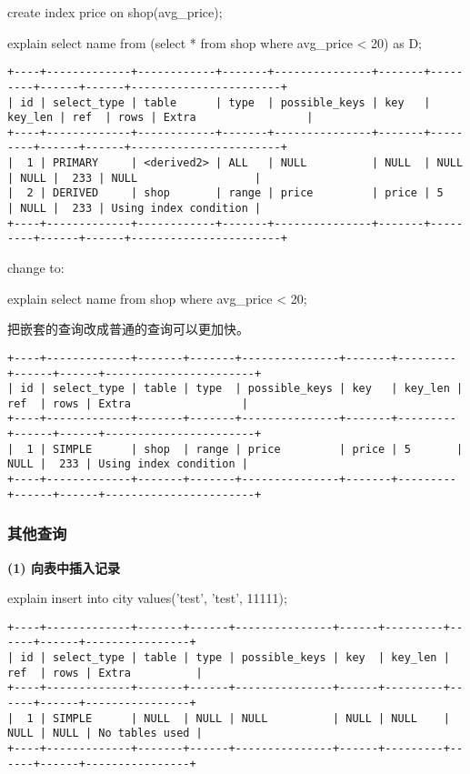 \documentclass[a4paper, 11pt, nofonts, nocap, fancyhdr]{ctexart}
\begin{document}
create index price on shop(avg\_price);

explain select name from (select * from shop where avg\_price < 20) as D;

\begin{verbatim}
+----+-------------+------------+-------+---------------+-------+---------+------+------+-----------------------+
| id | select_type | table      | type  | possible_keys | key   | key_len | ref  | rows | Extra                 |
+----+-------------+------------+-------+---------------+-------+---------+------+------+-----------------------+
|  1 | PRIMARY     | <derived2> | ALL   | NULL          | NULL  | NULL    | NULL |  233 | NULL                  |
|  2 | DERIVED     | shop       | range | price         | price | 5       | NULL |  233 | Using index condition |
+----+-------------+------------+-------+---------------+-------+---------+------+------+-----------------------+
\end{verbatim}

change to:

explain select name from shop where avg\_price < 20;

把嵌套的查询改成普通的查询可以更加快。

\begin{verbatim}
+----+-------------+-------+-------+---------------+-------+---------+------+------+-----------------------+
| id | select_type | table | type  | possible_keys | key   | key_len | ref  | rows | Extra                 |
+----+-------------+-------+-------+---------------+-------+---------+------+------+-----------------------+
|  1 | SIMPLE      | shop  | range | price         | price | 5       | NULL |  233 | Using index condition |
+----+-------------+-------+-------+---------------+-------+---------+------+------+-----------------------+
\end{verbatim}

\subsubsection{其他查询}

\textbf{(1) 向表中插入记录} 

explain insert into city values('test', 'test', 11111);

\begin{verbatim}
+----+-------------+-------+------+---------------+------+---------+------+------+----------------+
| id | select_type | table | type | possible_keys | key  | key_len | ref  | rows | Extra          |
+----+-------------+-------+------+---------------+------+---------+------+------+----------------+
|  1 | SIMPLE      | NULL  | NULL | NULL          | NULL | NULL    | NULL | NULL | No tables used |
+----+-------------+-------+------+---------------+------+---------+------+------+----------------+
\end{verbatim}
\end{document}
